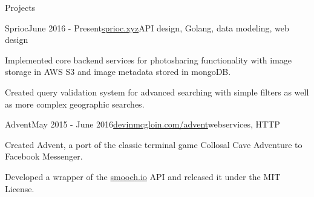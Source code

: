\documentclass{resume} %
\begin{document}
\begin{rSection}{Projects}


\begin{rSubsection}{Sprioc}{June 2016 - Present}{\href{https://sprioc.xyz}{sprioc.xyz}}{API design, Golang, data modeling, web design}
\item Implemented core backend services for photosharing functionality with image storage in AWS S3 and image metadata stored in mongoDB.
\item Created query validation system for advanced searching with simple filters as well as more complex geographic searches.
\end{rSubsection}


\begin{rSubsection}{Advent}{May 2015 - June 2016}{\href{https://devinmcgloin.com/advent}{devinmcgloin.com/advent}}{webservices, HTTP}
\item Created Advent, a port of the classic terminal game Collosal Cave Adventure to Facebook Messenger.
\item Developed a wrapper of the \href{https://smooch.io}{smooch.io} API and released it under the MIT License.
\end{rSubsection}


\end{rSection}

\end{document}
